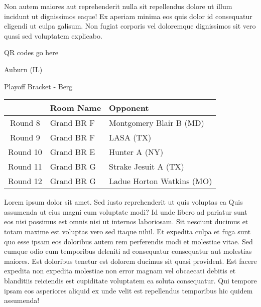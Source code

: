 \documentclass{article}%
\begin{document}
\newline%
Non autem maiores aut reprehenderit nulla sit repellendus dolore ut illum incidunt ut dignissimos eaque! Ex aperiam minima eos quis dolor id consequatur eligendi ut culpa galisum. Non fugiat corporis vel doloremque dignissimos sit vero quasi sed voluptatem explicabo.\newline%
\newline%
%
\vspace*{30pt}%
\begin{center}%
\begin{Huge}%
QR codes go here%
\end{Huge}%
\end{center}%
\newpage%
\begin{center}%
\begin{Huge}%
Auburn (IL)%
\end{Huge}%
\vspace*{8pt}%
\linebreak%
\begin{Large}%
Playoff Bracket {-} Berg%
\end{Large}%
\end{center}%
%
\begin{tabularx}{\textwidth}{|c|Y|Y|}%
\hline%
&Room Name&Opponent\\%
\hline%
Round 8&Grand BR F&Montgomery Blair B (MD)\\%
Round 9&Grand BR F&LASA (TX)\\%
Round 10&Grand BR E&Hunter A (NY)\\%
Round 11&Grand BR G&Strake Jesuit A (TX)\\%
Round 12&Grand BR G&Ladue Horton Watkins (MO)\\%
\hline%
\end{tabularx}%
\vspace*{8pt}%
\linebreak%
\newline%
\newline%
Lorem ipsum dolor sit amet. Sed iusto reprehenderit ut quis voluptas ea Quis assumenda ut eius magni eum voluptate modi? Id unde libero ad pariatur sunt eos nisi possimus est omnis nisi ut internos laboriosam. Sit nesciunt ducimus et totam maxime est voluptas vero sed itaque nihil. Et expedita culpa et fuga sunt quo esse ipsam eos doloribus autem rem perferendis modi et molestiae vitae.\newline%
\newline%
Sed cumque odio eum temporibus deleniti ad consequatur consequatur aut molestias maiores. Est doloribus tenetur est dolorem ducimus sit quasi provident. Est facere expedita non expedita molestiae non error magnam vel obcaecati debitis et blanditiis reiciendis est cupiditate voluptatem ea soluta consequatur. Qui tempore ipsam eos asperiores aliquid ex unde velit est repellendus temporibus hic quidem assumenda!\newline%
\end{document}
